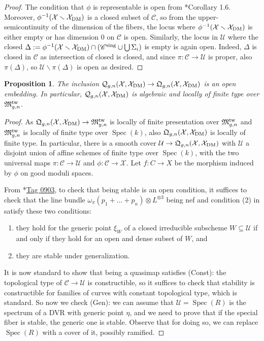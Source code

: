 \documentclass{amsart}
\newcommand{\sC}{\mathscr{C}}
\newcommand{\cC}{\mathcal{C}}
\newcommand{\cQ}{\mathcal{Q}}
\newcommand{\cU}{\mathcal{U}}
\newcommand{\cX}{\mathcal{X}}
\newcommand{\spec}{\operatorname{Spec}}
\newcommand{\dm}{{\rm DM}}
\newtheorem{Prop}[theorem]{Proposition}
\theoremstyle{definition}
\theoremstyle{definition}
\begin{document}
{\begin{proof}
    The condition that $\phi$ is representable is open from \cite{olshom}*{Corollary 1.6}.
Moreover, $\phi^{-1}(\cX\smallsetminus \cX_\dm)$ is a closed subset of $\cC$, so from the upper-semicontinuity of the dimension of the fibers, the locus where $\phi^{-1}(\cX\smallsetminus \cX_\dm)$ is either empty or has dimension 0 on $\cC$ is open. Similarly, the locus in $\cU$ where the closed $\Delta:=\phi^{-1}(\cX\smallsetminus \cX_\dm)\cap (\sC^{\operatorname{sing}}\cup \bigcup \Sigma_i)$ is empty is again open. Indeed, $\Delta$ is closed in $\sC$ as intersection of closed is closed, and since $\pi:\cC\to \cU$ is proper, also $\pi(\Delta)$, so $\cU\smallsetminus\pi(\Delta)$ is open as desired. 
\end{proof}
\begin{Prop}\label{prop_stable_qmap_is_an_open_cond}
    The inclusion $\cQ_{g,n}(\cX,\cX_\dm)\to \mathfrak{Q}_{g,n}(\cX,\cX_\dm)$ is an open embedding. In particular, $\cQ_{g,n}(\cX,\cX_\dm)$ is algebraic and locally of finite type over $\mathfrak{M}_{g,n}^{\rm tw}$.
\end{Prop}
\begin{proof}
    As $\mathfrak{Q}_{g,n}(\cX,\cX_\dm)\to \mathfrak{M}_{g,n}^{\rm tw}$ is locally of finite presentation over $\mathfrak{M}_{g,n}^{\rm tw}$ and $\mathfrak{M}_{g,n}^{\rm tw}$ is locally of finite type over $\spec(k)$, also $\mathfrak{Q}_{g,n}(\cX,\cX_\dm)$ is locally of finite type. In particular, there is a smooth cover $\cU\to \mathfrak{Q}_{g,n}(\cX,\cX_\dm)$ with $\cU$ a disjoint union of affine schemes of finite type over $\spec(k)$, with the two universal maps $\pi:\cC\to \cU$ and $\phi:\cC\to \cX$. Let $f:C\to X$ be the morphism induced by $\phi$ on good moduli spaces.
    
    From \cite{stacks-project}*{\href{https://stacks.math.columbia.edu/tag/0903}{Tag 0903}}, to check that being stable is an open condition, it suffices to check
     that the line bundle $\omega_\pi(p_1+\ldots+p_n)\otimes L^{\otimes 3}$ being nef and condition (2) in  satisfy these two conditions:
     \begin{enumerate}
         \item[(Const)] they hold for the generic point $\xi_W$ of a closed irreducible subscheme $W\subseteq \cU$ if and only if they hold for an open and dense subset of $W$, and
         \item[(Gen)] they are stable under generalization.
     \end{enumerate}
     It is now standard to show that being a quasimap satisfies (Const): the topological type of $\cC\to \cU$ is constructible, so it suffices to check that stability is constructible for families of curves with constant topological type, which is standard. So now we check (Gen): we can assume that $\cU=\spec(R)$ is the spectrum of a DVR with generic point $\eta$, and we need to prove that if the special fiber is stable, the generic one is stable. Observe that for doing so, we can replace $\spec(R)$ with a cover of it, possibly ramified.


\end{proof}}
\end{document}
